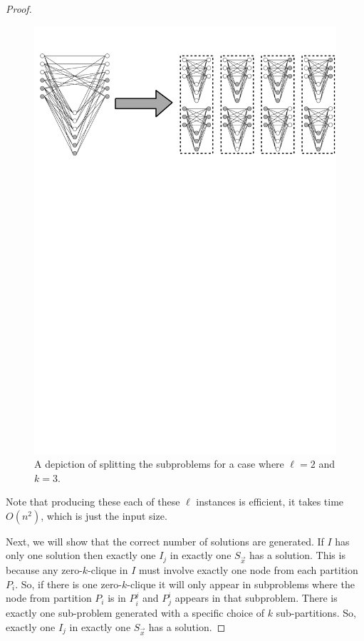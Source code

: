 \begin{proof}
	\begin{figure}[h]
		\centering
		\includegraphics[scale=0.6]{fgcrypto/list-hard-fig.pdf}
		\caption{A depiction of splitting the subproblems for a case where $\ell=2$ and $k=3$.}
		\label{fig:listHardReduction}
	\end{figure}
	
	Note that producing these each of these $\ell$ instances is efficient, it takes time $O(n^2)$, which is just the input size.
	
	Next, we will show that the correct number of solutions are generated. 
	If $I$ has only one solution then exactly one $I_j$ in exactly one $S_{\vec{x}}$ has a solution. This is because any zero-$k$-clique in $I$ must involve exactly one node from each partition $P_i$. So, if there is one zero-$k$-clique it will only appear in subproblems where the node from partition $P_i$ is in  $P_i^j$ and $P^i_j$ appears in that subproblem. There is exactly one sub-problem generated with a specific choice of $k$ sub-partitions. So, exactly one $I_j$ in exactly one $S_{\vec{x}}$ has a solution.
	

\end{proof}
